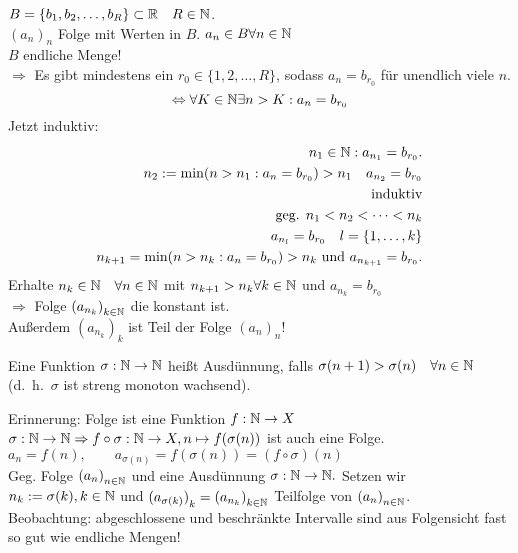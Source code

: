 \documentclass[../ana1.tex]{subfiles}
\begin{document}
\begin{bsp}
	\(B= \{b_1, b_2,\ldots,b_R \} \subset \mathbb{R} \quad R\in\mathbb{N} \).\\
	\( {(a_n)}_n \) Folge mit Werten in \(B\).
	\(a_n \in B \forall n\in\mathbb{N} \) \\
	\(B\) endliche Menge!\\
	\( \Rightarrow \) Es gibt mindestens ein \(r_0 \in \{1,2,\ldots,R\} \), sodass \( a_n=b_{r_0}  \) für unendlich viele \(n\).\\
	\[ \Leftrightarrow \forall K\in\mathbb{N} \exists n>K : a_n = b_{r_0} \]
	Jetzt induktiv: \\
	\begin{align*}
		n_1 \in\mathbb{N}: a_{n_1} = b_{r_0}.\\
		n_2 := \min (n>n_1:a_n=b_{r_0}) >n_1 \quad a_{n_2} = b_{r_0}\\
		\text{induktiv}\\
		\text{geg. } n_1 < n_2<\cdots<n_k\\
		a_{n_l} = b_{r_0} \quad l = \{1, \ldots,k \} \\
		n_{k+1} = \min(n>n_k:a_n = b_{r_0}) > n_k \text{ und } a_{n_{k+1}} = b_{r_0}.
	\end{align*}
	Erhalte \(n_k\in\mathbb{N} \quad \forall n\in\mathbb{N} \) mit \( n_{k+1} > n_k \forall k\in\mathbb{N} \) und \( a_{n_k} = b_{r_0} \) \\
	\( \Rightarrow \) Folge \( {(a_{n_k})}_{k\in\mathbb{N}} \) die konstant ist.\\
	Außerdem \( {(a_{n_k})}_k \) ist Teil der Folge \( {(a_n)}_n \)!
\end{bsp}
\begin{defi}[Teilfolge]
	Eine Funktion \( \sigma:\mathbb{N} \rightarrow\mathbb{N} \) heißt Ausdünnung, falls \( \sigma (n+1) > \sigma(n) \quad \forall n\in\mathbb{N} \) (d.\ h.\  \(\sigma \) ist streng monoton wachsend).
\end{defi}
Erinnerung: Folge ist eine Funktion \(f: \mathbb{N}\rightarrow X \) \\
\( \sigma : \mathbb{N}\rightarrow\mathbb{N} \Rightarrow f \circ \sigma : \mathbb{N}\rightarrow X, n\mapsto f(\sigma(n))  \) ist auch eine Folge.\\
\(a_n = f(n),\qquad a_{\sigma(n)} = f(\sigma(n)) = (f\circ\sigma)(n) \) \\
Geg. Folge \( {(a_n)}_{n\in\mathbb{N}} \) und eine Ausdünnung \( \sigma : \mathbb{N}\rightarrow \mathbb{N}. \) Setzen wir \( n_k := \sigma (k), k\in\mathbb{N} \) und \( {(a_{\sigma(k)})}_k = {(a_{n_k})}_{k\in\mathbb{N}} \) Teilfolge von \( {(a_n)}_{n\in\mathbb{N}} \).\\
Beobachtung: abgeschlossene und beschränkte Intervalle sind aus Folgensicht fast so gut wie endliche Mengen!
\end{document}
